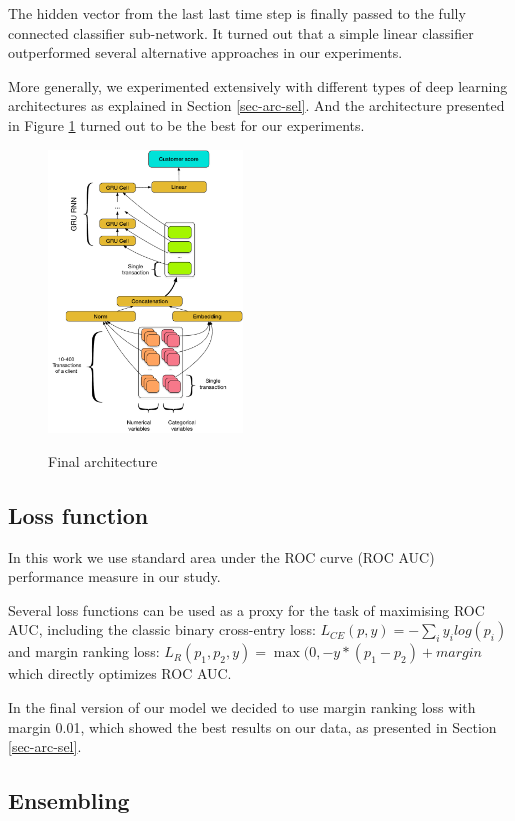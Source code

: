\documentclass[sigconf]{acmart}
\begin{document}
The hidden vector from the last last time step is finally passed to the fully connected classifier sub-network.
It turned out that a simple linear classifier outperformed several alternative approaches in our experiments.

More generally, we experimented extensively with different types of deep learning architectures as explained in Section \ref{sec-arc-sel}. And the architecture presented in Figure \ref{fig-arch} turned out to be the best for our experiments.


\begin{figure}[ht]
  \caption{Final architecture}
  \includegraphics[width=0.46\textwidth]{architecture.pdf}
  \label{fig-arch}
\end{figure}

\subsection{Loss function}

In this work we use standard area under the ROC curve (ROC AUC) performance measure in our study.

Several loss functions can be used as a proxy for the task of maximising ROC AUC, including the classic binary cross-entry loss: $L_{CE}(p, y) = - \sum_i y_ilog(p_i)$ and margin ranking loss: $ L_R(p_1, p_2, y) = \max(0, -y * (p_1 - p_2) + margin $ which directly optimizes ROC AUC.

In the final version of our model we decided to use margin ranking loss with margin 0.01, which showed the best results on our data, as presented in Section \ref{sec-arc-sel}.

\subsection{Ensembling}
\end{document}
